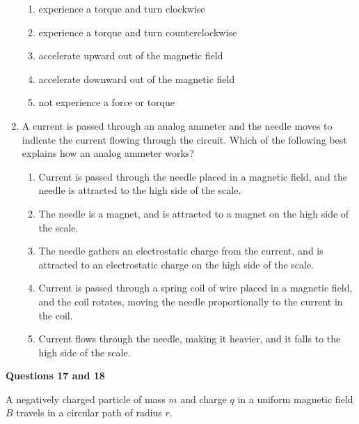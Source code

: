 \documentclass{../../oss-apphys}
\begin{document}
\begin{multicols}{2}
\begin{enumerate}[leftmargin=18pt]
    \begin{enumerate}[noitemsep,topsep=0pt,leftmargin=18pt,label=(\Alph*)]
    \item experience a torque and turn clockwise
    \item experience a torque and turn counterclockwise
    \item accelerate upward out of the magnetic field
    \item accelerate downward out of the magnetic field
    \item not experience a force or torque
    \end{enumerate}

  \item A current is passed through an analog ammeter and the needle moves
    to indicate the current flowing through the circuit. Which of the
    following best explains how an analog ammeter works?
    \begin{enumerate}[noitemsep,topsep=0pt,leftmargin=18pt,label=(\Alph*)]
    \item Current is passed through the needle placed in a magnetic field, and
      the needle is attracted to the high side of the scale.
    \item The needle is a magnet, and is attracted to a magnet on the high side
      of the scale.
    \item The needle gathers an electrostatic charge from the current, and is
      attracted to an electrostatic charge on the high side of the scale.
    \item Current is passed through a spring coil of wire placed in a magnetic
      field, and the coil rotates, moving the needle proportionally to the
      current in the coil.
    \item Current flows through the needle, making it heavier, and it falls to
      the high side of the scale.
    \end{enumerate}
  \end{enumerate}

  \columnbreak
  
  \textbf{Questions 17 and 18}
  
  A negatively charged particle of mass $m$ and charge $q$ in a uniform
  magnetic field $B$ travels in a circular path of radius $r$.
  \begin{center}
  \end{center}


\end{multicols}
\end{document}
